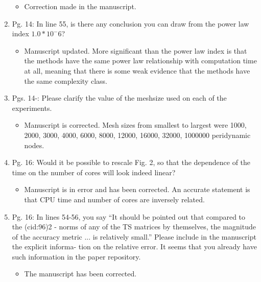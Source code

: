 \documentclass{article}
\begin{document}
\begin{enumerate}
{\color{red}  
\begin{itemize}
    \item
        Correction made in the manuscript. 
  \end{itemize}}

  \item
    Pg. 14: In line 55, is there any conclusion you can draw from the power law index
    $1.0 * 10^-6$?

{\color{red}  
\begin{itemize}
     \item
      Manuscript updated. More significant than the power law index is that the methods have the same power law relationship with computation time at all, meaning that there is some weak evidence that the methods have the same complexity class. 
  \end{itemize}}

  \item
    Pgs. 14-: Please clarify the value of the meshsize used on each of the experiments.

{\color{red}  
\begin{itemize}
     \item
         Manuscript is corrected. Mesh sizes from smallest to largest were 1000, 2000, 3000, 4000, 6000, 8000, 12000,
         16000, 32000, 1000000 peridynamic nodes.
      \end{itemize}}

  \item
    Pg. 16: Would it be possible to rescale Fig. 2, so that the dependence of the time
    on the number of cores will look indeed linear?

{\color{red}  
\begin{itemize}
     \item
     Manuscript is in error and has been corrected. An accurate statement is that CPU time and number of cores are inversely related.
  \end{itemize}}

  \item
    Pg. 16: In lines 54-56, you say “It should be pointed out that compared to the (cid:96)2 -
    norms of any of the TS matrices by themselves, the magnitude of the accuracy
    metric ... is relatively small.” Please include in the manuscript the explicit informa-
    tion on the relative error. It seems that you already have such information in the
    paper repository.

{\color{red}  
\begin{itemize}
     \item
    The manuscript has been corrected. 
    \end{itemize}}


\end{enumerate}
\end{document}
